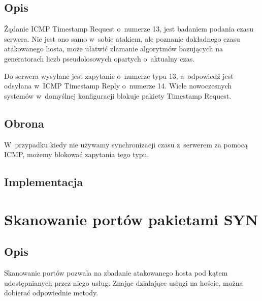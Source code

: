 \documentclass[a4paper,12pt]{book}
\begin{document}
		\subsection{Opis}
			Żądanie ICMP Timestamp Request o~numerze 13, jest badaniem podania czasu serwera.
			Nie jest ono samo w~sobie atakiem, ale poznanie dokładnego czasu atakowanego hosta, może ułatwić złamanie algorytmów bazujących na generatorach liczb pseudolosowych opartych o~aktualny czas.
			
			Do serwera wysyłane jest zapytanie o~numerze typu 13, a~odpowiedź jest odsyłana w~ICMP Timestamp Reply o~numerze 14. Wiele nowoczesnych systemów w~domyślnej konfiguracji blokuje pakiety Timestamp Request.
		\subsection{Obrona}
			W~przypadku kiedy nie używamy synchronizacji czasu z~serwerem za pomocą ICMP, możemy blokować zapytania tego typu.
		\subsection{Implementacja}
			\footnotesize
			\normalsize
	\section{Skanowanie portów pakietami SYN}
		\label{sec:syn_scan}
		\subsection{Opis}
			Skanowanie portów pozwala na zbadanie atakowanego hosta pod kątem udostępnianych przez niego usług. Znając działające usługi na hoście, można dobierać odpowiednie metody.		
			
\end{document}
